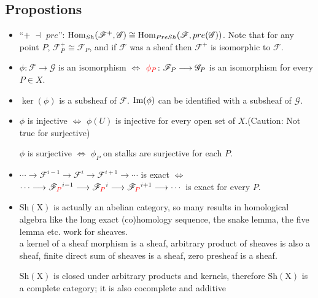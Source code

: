 \subsection*{Propostions} 
\begin{itemize}
	\item ``{\color{red}$+$ $\dashv$ $pre$}'': $\mathop{\mathrm{Hom}}_{Sh}(\mathcal{F}^+,\mathcal{G}) \cong \mathop{\mathrm{Hom}}_{PreSh}(\mathcal{F},pre(\mathcal{G}))$. Note that for any point $P$, $\mathcal{F}^+_P\cong \mathcal{F}_P$, and if $\mathcal{F}$ was a sheaf then $\mathcal{F}^+$ is isomorphic to $\mathcal{F}$.
	\item $\phi \colon \mathcal{F} \longrightarrow \mathcal{G}$ is an isomorphism $\Longleftrightarrow$ ${\color{red}\phi_P} \colon \mathcal{F}_P \longrightarrow \mathcal{G}_P$ is an isomorphism for every $P\in X$. 
	\item $\ker(\phi)$ is a subsheaf of $\mathcal{F}$. $\mathrm{Im}(\phi)$ can be identified with a subsheaf of $\mathcal{G}$.
	\item $\phi$ is injective $\Longleftrightarrow$ {\color{red}$\phi(U)$ is injective} for every open set of $X$.(Caution: {\color{red}Not true for surjective})

$\phi$ is surjective $\Longleftrightarrow$ {\color{red}$\phi_P$ on stalks are surjective} for each $P$. 
	\item 
$\cdots \longrightarrow \mathcal{F}^{i-1} \longrightarrow \mathcal{F}^{i} \longrightarrow \mathcal{F}^{i+1} \longrightarrow \cdots$ is exact $\Longleftrightarrow$ $\cdots \longrightarrow \mathcal{F}_{\color{red}P}^{i-1} \longrightarrow \mathcal{F}_{\color{red}P}^{i} \longrightarrow \mathcal{F}_{\color{red}P}^{i+1} \longrightarrow \cdots$ is exact for every $P$.
	\item $\mathrm{Sh(X)}$ is actually an abelian category, so many results in homological algebra like
the long exact (co)homology sequence, the snake lemma, the five lemma etc. work for
sheaves. \\
	 a kernel of a sheaf morphism is a sheaf, arbitrary product of sheaves is also a sheaf,  finite direct sum of sheaves is a sheaf, zero presheaf is a sheaf.

	 $\mathrm{Sh(X)}$ is closed under arbitrary products and kernels, therefore $\mathrm{Sh(X)}$ is a complete category; it is also cocomplete and additive
\end{itemize}

